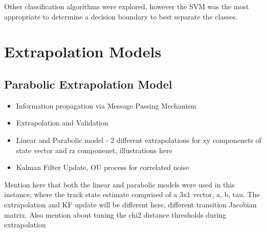 
Other classification algorithms were explored, however the SVM was the most appropriate to determine a decision boundary to best separate the classes.






\section{Extrapolation Models}
\label{chapter-6-extrapolation}

\subsection{Parabolic Extrapolation Model}
\begin{itemize}
    \item Information propagation via Message Passing Mechanism
    \item Extrapolation and Validation
    \item Linear and Parabolic model - 2 different extrapolations for xy componenets of state vector and rz componenet, illustrations here
    \item Kalman Filter Update, OU process for correlated noise
\end{itemize}

Mention here that both the linear and parabolic models were used in this instance, where the track state estimate comprised of a 3x1 vector, a, b, tau. The extrapolation and KF update will be different here, different transition Jacobian matrix. Also mention about tuning the chi2 distance thresholds during extrapolation


